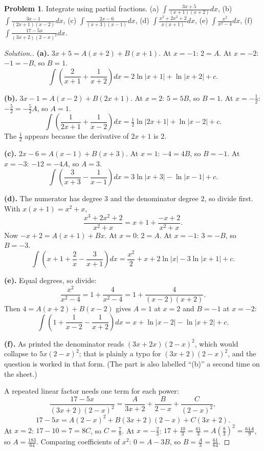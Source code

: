 \documentclass[11pt,a4paper]{article}
\theoremstyle{definition}
\newtheorem{problemx}{Problem}[section]
\newenvironment{problem}{\begin{problemx}}{\end{problemx}}
\newenvironment{solution}
  {\renewcommand{\qedsymbol}{}\begin{proof}[\textit{Solution}.]}
  {\end{proof}}
\begin{document}
\begin{problem}
Integrate using partial fractions.
\quad (a) $\int\frac{3x+5}{(x+1)(x+2)}dx$, \quad
(b) $\int\frac{3x-1}{(2x+1)(x-2)}dx$, \quad
(c) $\int\frac{2x-6}{(x+3)(x-1)}dx$, \quad
(d) $\int\frac{x^3+2x^2+2}{x(x+1)}dx$, \quad
(e) $\int\frac{x^2}{x^2-4}dx$, \quad
(f) $\int\frac{17-5x}{(3x+2)(2-x)^2}dx$.
\end{problem}

\begin{solution}
\textbf{(a).} $3x+5=A(x+2)+B(x+1)$. At $x=-1$: $2=A$. At $x=-2$: $-1=-B$, so $B=1$.
$$\int\left(\frac{2}{x+1}+\frac{1}{x+2}\right)dx=2\ln|x+1|+\ln|x+2|+c.$$

\textbf{(b).} $3x-1=A(x-2)+B(2x+1)$. At $x=2$: $5=5B$, so $B=1$. At $x=-\frac{1}{2}$:
$-\frac{5}{2}=-\frac{5}{2}A$, so $A=1$.
$$\int\left(\frac{1}{2x+1}+\frac{1}{x-2}\right)dx=\tfrac{1}{2}\ln|2x+1|+\ln|x-2|+c.$$
The $\frac{1}{2}$ appears because the derivative of $2x+1$ is $2$.

\textbf{(c).} $2x-6=A(x-1)+B(x+3)$. At $x=1$: $-4=4B$, so $B=-1$. At $x=-3$:
$-12=-4A$, so $A=3$.
$$\int\left(\frac{3}{x+3}-\frac{1}{x-1}\right)dx=3\ln|x+3|-\ln|x-1|+c.$$

\textbf{(d).} The numerator has degree $3$ and the denominator degree $2$, so divide
first. With $x(x+1)=x^2+x$,
$$\frac{x^3+2x^2+2}{x^2+x}=x+1+\frac{-x+2}{x^2+x}.$$
Now $-x+2=A(x+1)+Bx$. At $x=0$: $2=A$. At $x=-1$: $3=-B$, so $B=-3$.
$$\int\left(x+1+\frac{2}{x}-\frac{3}{x+1}\right)dx
=\frac{x^2}{2}+x+2\ln|x|-3\ln|x+1|+c.$$

\textbf{(e).} Equal degrees, so divide:
$$\frac{x^2}{x^2-4}=1+\frac{4}{x^2-4}=1+\frac{4}{(x-2)(x+2)}.$$
Then $4=A(x+2)+B(x-2)$ gives $A=1$ at $x=2$ and $B=-1$ at $x=-2$:
$$\int\left(1+\frac{1}{x-2}-\frac{1}{x+2}\right)dx=x+\ln|x-2|-\ln|x+2|+c.$$

\textbf{(f).} As printed the denominator reads $(3x+2x)(2-x)^2$, which would collapse to
$5x(2-x)^2$; that is plainly a typo for $(3x+2)(2-x)^2$, and the question is worked in
that form. (The part is also labelled ``(b)'' a second time on the sheet.)

A repeated linear factor needs one term for each power:
$$\frac{17-5x}{(3x+2)(2-x)^2}=\frac{A}{3x+2}+\frac{B}{2-x}+\frac{C}{(2-x)^2},$$
$$17-5x=A(2-x)^2+B(3x+2)(2-x)+C(3x+2).$$
At $x=2$: $17-10=7=8C$, so $C=\frac{7}{8}$.
At $x=-\frac{2}{3}$: $17+\frac{10}{3}=\frac{61}{3}=A\left(\frac{8}{3}\right)^2
=\frac{64A}{9}$, so $A=\frac{183}{64}$.
Comparing coefficients of $x^2$: $0=A-3B$, so $B=\frac{A}{3}=\frac{61}{64}$.


\end{solution}
\end{document}
